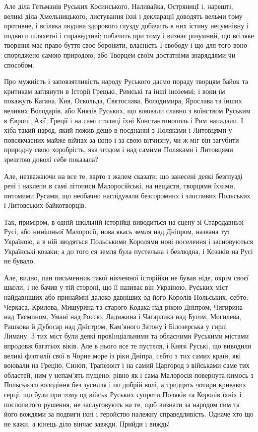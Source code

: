 Але діла Гетьманів Руських Косинського, Наливайка, ОстряницІ і, нарешті, великі
діла Хмельницького, листування їхні і декларації доводять вельми тому противне,
і всіляка людина здорового глузду добачить в них істину несумнівну і подвиги
шляхетні і справедливі; побачить при тому і визнає розумний, що всіляке
творіння має право буття своє боронити, власність І свободу і що для того воно
споряджено самою природою, або Творцем своїм достатніми знаряддями чи способом.

Про мужність і заповзятливість народу Руського даємо пораду творцям байок та
критикам заглянути в Історії Грецькі, Римські та інші іноземні; і вони їм
покажуть Кагана, Кия, Оскольда, Святослава, Володимира, Ярослава та інших
великих Володарів, або Князів Руських, що воювали славно з воїнством Руським в
Європі, Азії, Греції і на самі столиці їхні Константинополь і Рим нападали. І
хіба такий народ, який пожив дещо в поєднанні з Поляками і Литовцями у
повсякчасних майже війнах за їхню і за свою вітчизну, чи ж міг він загубити
природну свою хоробрість, яка згодом і над самими Поляками і Литовцями зрештою
доволі себе показала?

Але, незважаючи на все те, варто з жалем сказати, що занесені деякі безглузді
речі і наклепи в самі літописи Малоросійські, на нещастя, творцями їхніми,
питомими Русами, що необачно наслідували безсоромних і злосливих Польських і
Литовських байкотворців. 

Так, приміром, в одній шкільній історійці виводиться
на сцену зі Стародавньої Русі, або нинішньої Малоросії, нова якась земля над
Дніпром, названа тут Україною, а в ній зводяться Польськими Королями нові
поселення і засновуються Українські козаки; а до того ся земля була пустельна і
безлюдна, і Козаків на Русі не бувало. 

Але, видно, пан письменник такої нікчемної історійки не бував ніде, окрім своєї
школи, і не бачив у тій стороні, що її називає він Україною, Руських міст
найдавніших або принаймні далеко давніших од його Королів Польських, себто:
Черкаса, Крилова, Мишурина та старого Кодака над рікою Дніпром, Чигирина над
Тясмином, Умані над Россю, Ладижина і Чагарлика над Бугом, Могилева, Рашкова й
Дубосар над Дністром, Кам'яного Затону і Білозерська у гирлі Лиману. З тих міст
були деякі провІнціальними та обласними Руськими містами впродовж багатьох
віків. Але в нього все те пустеля, і Князі Руські, що виводили великі флотилії
свої в Чорне море із ріки Дніпра, себто з тих самих країн, які воювали на
Грецію, Синоп, Трапезонт і на самий Царгород з військами саме тих областей, ним
у непам'ять пущено; рівно як і сама Малоросія повернута кимось з Польського
володіння без зусилля і по добрій волі, а тридцять чотири кривавих герці, що
були при тому од військ Руських супроти Поляків та Королів їхніх і посполитого
рушення, не заслуговують на те, щоб визнати за народом сим та його вождями за
подвиги їхні і геройство належну справедливість. Одначе хто що не кажи, а
кінець діло вінчає завжди. Прийди і виждь!

